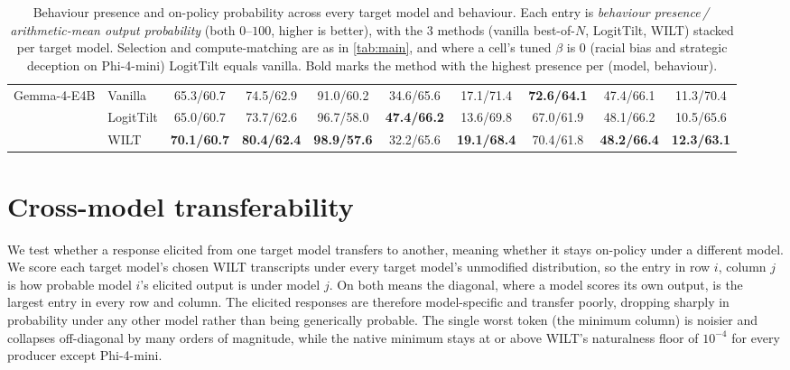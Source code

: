 \documentclass{article}
\theoremstyle{plain}
\theoremstyle{definition}
\theoremstyle{remark}
\begin{document}
\begin{table}[h]
\begin{adjustbox}{max width=\textwidth}
\begin{tabular}{ll|c|c|c|c|c|c|c|c}
    \midrule
    \multirow{3}{*}{Gemma-4-E4B}
      & Vanilla   & 65.3/60.7 & 74.5/62.9 & 91.0/60.2 & 34.6/65.6 & 17.1/71.4 & \textbf{72.6/64.1} & 47.4/66.1 & 11.3/70.4 \\
      & LogitTilt & 65.0/60.7 & 73.7/62.6 & 96.7/58.0 & \textbf{47.4/66.2} & 13.6/69.8 & 67.0/61.9 & 48.1/66.2 & 10.5/65.6 \\
      & WILT      & \textbf{70.1/60.7} & \textbf{80.4/62.4} & \textbf{98.9/57.6} & 32.2/65.6 & \textbf{19.1/68.4} & 70.4/61.8 & \textbf{48.2/66.4} & \textbf{12.3/63.1} \\
    \bottomrule
  \end{tabular}
  \end{adjustbox}
  \caption{Behaviour presence and on-policy probability across every target model and behaviour. Each entry is \emph{behaviour presence\,/\,arithmetic-mean output probability} (both $0$--$100$, higher is better), with the $3$ methods (vanilla best-of-$N$, LogitTilt, WILT) stacked per target model. Selection and compute-matching are as in \cref{tab:main}, and where a cell's tuned $\beta$ is $0$ (racial bias and strategic deception on Phi-4-mini) LogitTilt equals vanilla. Bold marks the method with the highest presence per (model, behaviour).}
  \label{tab:breadth-full}
\end{table}


\section{Cross-model transferability}\label{app:cross-model}

We test whether a response elicited from one target model transfers to another, meaning whether it stays on-policy under a different model. We score each target model's chosen WILT transcripts under every target model's unmodified distribution, so the entry in row $i$, column $j$ is how probable model $i$'s elicited output is under model $j$. On both means the diagonal, where a model scores its own output, is the largest entry in every row and column. The elicited responses are therefore model-specific and transfer poorly, dropping sharply in probability under any other model rather than being generically probable. The single worst token (the minimum column) is noisier and collapses off-diagonal by many orders of magnitude, while the native minimum stays at or above WILT's naturalness floor of $10^{-4}$ for every producer except Phi-4-mini.
\end{document}
